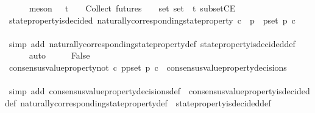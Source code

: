 \begin{isabellebody}
\ \ \ \ \isamarkupfalse%
\ {\isacharparenleft}meson\ {\isacartoucheopen}{\isasymsigma}{\isacharprime}\ {\isasymin}\ {\isasymSigma}t\ {\isasymand}\ {\isasymsigma}{\isacharprime}\ {\isasymin}\ {\isasymInter}{\isacharunderscore}Collect\ {\isacharparenleft}futures\ {\isasymsigma}{\isacharparenright}\ {\isacharparenleft}{\isasymsigma}\ {\isasymin}\ {\isasymsigma}{\isacharunderscore}set{\isacharparenright}{\isacartoucheclose}\ {\isacartoucheopen}{\isasymsigma}{\isacharunderscore}set\ {\isasymsubseteq}\ {\isasymSigma}t{\isacartoucheclose}\ subsetCE{\isacharparenright}\isanewline
\ \ \isamarkupfalse%
\ {\isachardoublequoteopen}state{\isacharunderscore}property{\isacharunderscore}is{\isacharunderscore}decided\ {\isacharparenleft}naturally{\isacharunderscore}corresponding{\isacharunderscore}state{\isacharunderscore}property\ {\isacharparenleft}{\isasymlambda}c{\isachardot}\ {\isasymforall}\ p\ {\isasymin}\ p{\isacharunderscore}set{\isachardot}\ p\ c{\isacharparenright}{\isacharcomma}\ {\isasymsigma}{\isacharprime}{\isacharparenright}{\isachardoublequoteclose}\isanewline
\ \ \ \ \isamarkupfalse%
\ {\isacharparenleft}simp\ add{\isacharcolon}\ naturally{\isacharunderscore}corresponding{\isacharunderscore}state{\isacharunderscore}property{\isacharunderscore}def\ state{\isacharunderscore}property{\isacharunderscore}is{\isacharunderscore}decided{\isacharunderscore}def{\isacharparenright}\isanewline
\ \ \ \ \isamarkupfalse%
\ auto\isanewline
\ \ \isamarkupfalse%
\ \isamarkupfalse%
\ False\isanewline
\ \ \ \ \isamarkupfalse%
\ {\isacartoucheopen}consensus{\isacharunderscore}value{\isacharunderscore}property{\isacharunderscore}not\ {\isacharparenleft}{\isasymlambda}c{\isachardot}\ {\isasymforall}p{\isasymin}p{\isacharunderscore}set{\isachardot}\ p\ c{\isacharparenright}\ {\isasymin}\ consensus{\isacharunderscore}value{\isacharunderscore}property{\isacharunderscore}decisions\ {\isasymsigma}{\isacartoucheclose}\ \isanewline
\ \ \ \ \isamarkupfalse%
\ {\isacharparenleft}simp\ add{\isacharcolon}\ consensus{\isacharunderscore}value{\isacharunderscore}property{\isacharunderscore}decisions{\isacharunderscore}def\ \ consensus{\isacharunderscore}value{\isacharunderscore}property{\isacharunderscore}is{\isacharunderscore}decided{\isacharunderscore}def\ naturally{\isacharunderscore}corresponding{\isacharunderscore}state{\isacharunderscore}property{\isacharunderscore}def\ \ state{\isacharunderscore}property{\isacharunderscore}is{\isacharunderscore}decided{\isacharunderscore}def{\isacharparenright}\isanewline

\end{isabellebody}
